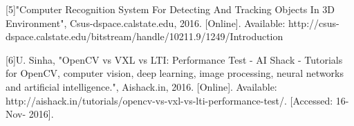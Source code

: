 \documentclass[letterpaper,10pt,onecolumn,draftclsnofoot]{IEEEtran}
\begin{document}
[5]"Computer Recognition System For Detecting And Tracking Objects In 3D Environment", Csus-dspace.calstate.edu, 2016. [Online]. Available: http://csus-dspace.calstate.edu/bitstream/handle/10211.9/1249/Introduction%

[6]U. Sinha, "OpenCV vs VXL vs LTI: Performance Test - AI Shack - Tutorials for OpenCV, computer vision, deep learning, image processing, neural networks and artificial intelligence.", Aishack.in, 2016. [Online]. Available: http://aishack.in/tutorials/opencv-vs-vxl-vs-lti-performance-test/. [Accessed: 16- Nov- 2016].




\end{document}
